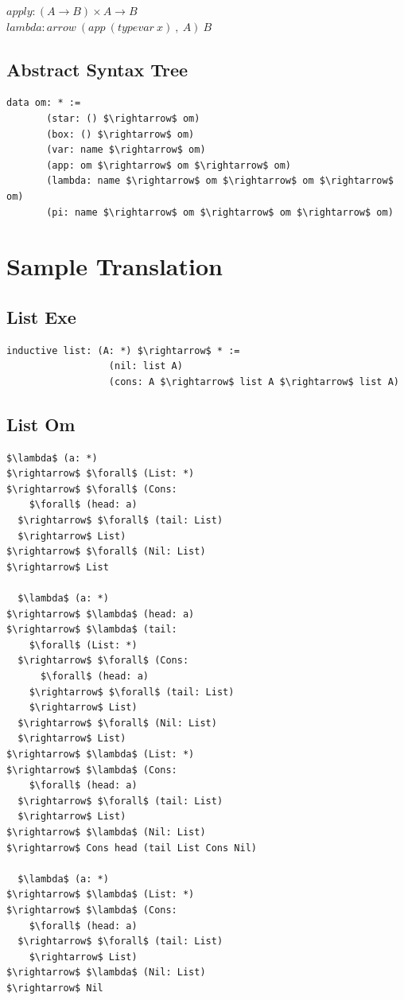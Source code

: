 \documentclass[11pt,oneside]{article}
\begin{document}
\begin{center}
                   $apply: (A \rightarrow B) \times A \rightarrow B$ \\
                  $lambda: arrow\ (app\ (typevar\ x)\ ,\ A)\ B$ \\
\end{center}

   \subsection{Abstract Syntax Tree}

\begin{lstlisting}[mathescape=true]
  data om: * := 
       (star: () $\rightarrow$ om)
       (box: () $\rightarrow$ om)
       (var: name $\rightarrow$ om)
       (app: om $\rightarrow$ om $\rightarrow$ om)
       (lambda: name $\rightarrow$ om $\rightarrow$ om $\rightarrow$ om)                      
       (pi: name $\rightarrow$ om $\rightarrow$ om $\rightarrow$ om)
\end{lstlisting}

\newpage

   \section{Sample Translation}

   \subsection{List Exe}
\begin{lstlisting}[mathescape=true]
        inductive list: (A: *) $\rightarrow$ * :=
                  (nil: list A)
                  (cons: A $\rightarrow$ list A $\rightarrow$ list A)
\end{lstlisting}


   \subsection{List Om}
\begin{lstlisting}[mathescape=true]
  $\lambda$ (a: *)
$\rightarrow$ $\forall$ (List: *)
$\rightarrow$ $\forall$ (Cons:
    $\forall$ (head: a)
  $\rightarrow$ $\forall$ (tail: List)
  $\rightarrow$ List)
$\rightarrow$ $\forall$ (Nil: List)
$\rightarrow$ List

  $\lambda$ (a: *)
$\rightarrow$ $\lambda$ (head: a)
$\rightarrow$ $\lambda$ (tail:
    $\forall$ (List: *)
  $\rightarrow$ $\forall$ (Cons:
      $\forall$ (head: a)
    $\rightarrow$ $\forall$ (tail: List)
    $\rightarrow$ List)
  $\rightarrow$ $\forall$ (Nil: List)
  $\rightarrow$ List)
$\rightarrow$ $\lambda$ (List: *)
$\rightarrow$ $\lambda$ (Cons:
    $\forall$ (head: a)
  $\rightarrow$ $\forall$ (tail: List)
  $\rightarrow$ List)
$\rightarrow$ $\lambda$ (Nil: List)
$\rightarrow$ Cons head (tail List Cons Nil)

  $\lambda$ (a: *)
$\rightarrow$ $\lambda$ (List: *)
$\rightarrow$ $\lambda$ (Cons:
    $\forall$ (head: a)
  $\rightarrow$ $\forall$ (tail: List)
    $\rightarrow$ List)
$\rightarrow$ $\lambda$ (Nil: List)
$\rightarrow$ Nil

\end{lstlisting}
\end{document}
